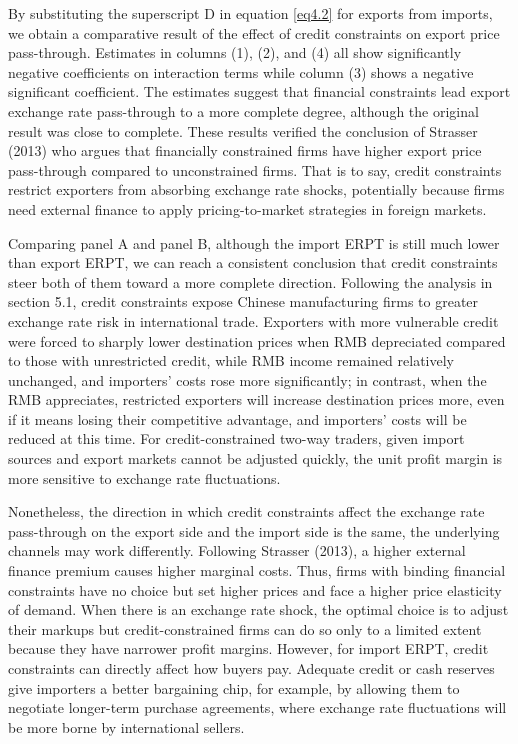 By substituting the superscript D in equation \ref{eq4.2} for exports from imports, we obtain a comparative result of the effect of credit constraints on export price pass-through. Estimates in columns (1), (2), and (4) all show significantly negative coefficients on interaction terms while column (3) shows a negative significant coefficient. The estimates suggest that financial constraints lead export exchange rate pass-through to a more complete degree, although the original result was close to complete. These results verified the conclusion of Strasser (2013)\cite{strasser2013} who argues that financially constrained firms have higher export price pass-through compared to unconstrained firms. That is to say, credit constraints restrict exporters from absorbing exchange rate shocks, potentially because firms need external finance to apply pricing-to-market strategies in foreign markets.

Comparing panel A and panel B, although the import ERPT is still much lower than export ERPT, we can reach a consistent conclusion that credit constraints steer both of them toward a more complete direction. Following the analysis in section 5.1, credit constraints expose Chinese manufacturing firms to greater exchange rate risk in international trade. Exporters with more vulnerable credit were forced to sharply lower destination prices when RMB depreciated compared to those with unrestricted credit, while RMB income remained relatively unchanged, and importers’ costs rose more significantly; in contrast, when the RMB appreciates, restricted exporters will increase destination prices more, even if it means losing their competitive advantage, and importers' costs will be reduced at this time. For credit-constrained two-way traders, given import sources and export markets cannot be adjusted quickly, the unit profit margin is more sensitive to exchange rate fluctuations.

Nonetheless, the direction in which credit constraints affect the exchange rate pass-through on the export side and the import side is the same, the underlying channels may work differently. Following Strasser (2013)\cite{strasser2013}, a higher external finance premium causes higher marginal costs. Thus, firms with binding financial constraints have no choice but set higher prices and face a higher price elasticity of demand. When there is an exchange rate shock, the optimal choice is to adjust their markups but credit-constrained firms can do so only to a limited extent because they have narrower profit margins. However, for import ERPT, credit constraints can directly affect how buyers pay. Adequate credit or cash reserves give importers a better bargaining chip, for example, by allowing them to negotiate longer-term purchase agreements, where exchange rate fluctuations will be more borne by international sellers.

